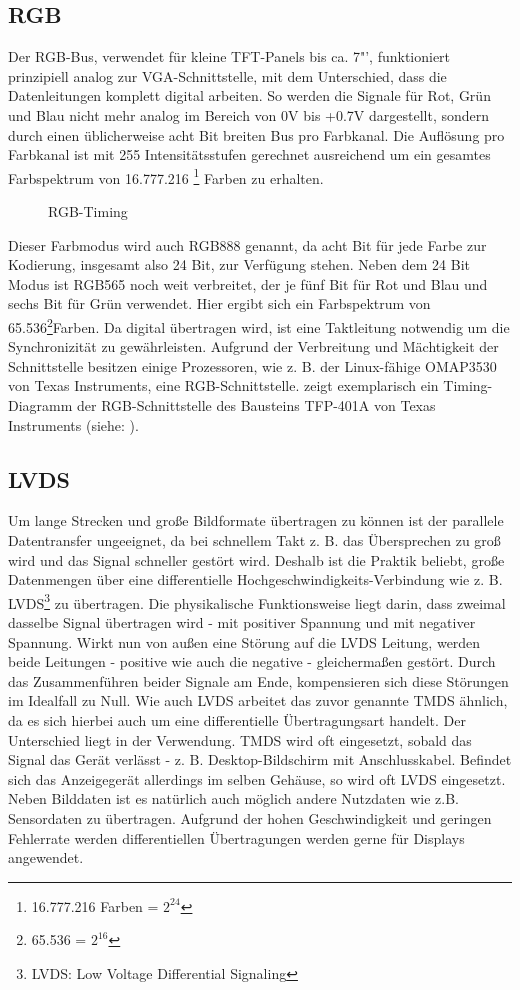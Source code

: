 \subsection{RGB}
Der RGB-Bus, verwendet für kleine TFT-Panels bis ca. 7"', funktioniert prinzipiell analog zur VGA-Schnittstelle, mit dem Unterschied, dass die Datenleitungen komplett digital arbeiten. 
So werden die Signale für Rot, Grün und Blau nicht mehr analog im Bereich von 0V bis +0.7V dargestellt, sondern durch einen üblicherweise acht Bit breiten Bus pro Farbkanal. Die Auflösung pro Farbkanal ist mit 255 Intensitätsstufen gerechnet ausreichend um ein gesamtes Farbspektrum von 16.777.216 \footnote{16.777.216 Farben = $2^{24}$} Farben zu erhalten. 
\begin{figure}[htp]
	\centering
{}
	\caption{RGB-Timing}
	\label{fig:rgb_timing}
\end{figure}
Dieser Farbmodus wird auch RGB888 genannt, da acht Bit für jede Farbe zur Kodierung, insgesamt also 24 Bit, zur Verfügung stehen. Neben dem 24 Bit Modus ist RGB565 noch weit verbreitet, der je fünf Bit für Rot und Blau und sechs Bit für Grün verwendet. Hier ergibt sich ein Farbspektrum von 65.536\footnote{65.536 = $2^{16}$}Farben. Da digital übertragen wird, ist eine Taktleitung notwendig um die Synchronizität zu gewährleisten. 
Aufgrund der Verbreitung und Mächtigkeit der Schnittstelle besitzen einige Prozessoren, wie z. B. der Linux-fähige OMAP3530 von Texas Instruments, eine RGB-Schnittstelle. 
 zeigt exemplarisch ein Timing-Diagramm der RGB-Schnittstelle des Bausteins TFP-401A von Texas Instruments (siehe: \cite{TI2011}).
\subsection{LVDS}
Um lange Strecken und große Bildformate übertragen zu können ist der parallele Datentransfer ungeeignet, da bei schnellem Takt z. B. das Übersprechen zu groß wird und das Signal schneller gestört wird. Deshalb ist die Praktik beliebt, große Datenmengen über eine differentielle Hochgeschwindigkeits-Verbindung wie z. B. LVDS\footnote{LVDS: Low Voltage Differential Signaling} zu übertragen. Die physikalische Funktionsweise liegt darin, dass zweimal dasselbe Signal übertragen wird - mit positiver Spannung und mit negativer Spannung. Wirkt nun von außen eine Störung auf die LVDS Leitung, werden beide Leitungen - positive wie auch die negative - gleichermaßen gestört. Durch das Zusammenführen beider Signale am Ende, kompensieren sich diese Störungen im Idealfall zu Null. Wie auch LVDS arbeitet das zuvor genannte TMDS ähnlich, da es sich hierbei auch um eine differentielle Übertragungsart handelt. Der Unterschied liegt in der Verwendung. TMDS wird oft eingesetzt, sobald das Signal das Gerät verlässt - z. B. Desktop-Bildschirm mit Anschlusskabel. Befindet sich das Anzeigegerät allerdings im selben Gehäuse, so wird oft LVDS eingesetzt. Neben Bilddaten ist es natürlich auch möglich andere Nutzdaten wie z.B. Sensordaten zu übertragen. 
Aufgrund der hohen Geschwindigkeit und geringen Fehlerrate werden differentiellen Übertragungen werden gerne für Displays angewendet.
